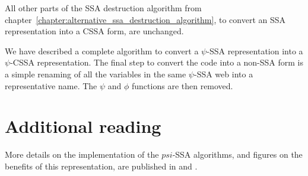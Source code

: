 All other parts of the SSA destruction algorithm from
chapter~\ref{chapter:alternative_ssa_destruction_algorithm}, to convert an SSA
representation into a CSSA form, are unchanged.

We have described a complete algorithm to convert a $\psi$-SSA
representation into a $\psi$-CSSA representation. The final step to
convert the code into a non-SSA form is a simple renaming of all the
variables in the same $\psi$-SSA web into a representative name. The
$\psi$ and $\phi$ functions are then removed.






\section{Additional reading}

More details on the implementation of the $psi$-SSA algorithms, and
figures on the benefits of this representation, are published in
\cite{Stouchinin2001} and \cite{deferriere2006}.
